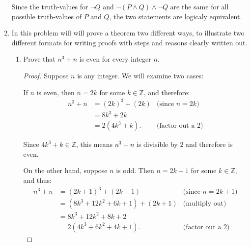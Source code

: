 \documentclass{article} %
\begin{document}
\begin{enumerate}
Since the truth-values for $\neg Q$ and $\neg(P \land Q) \land \neg Q$ are the same for all possible truth-values of $P$ and $Q$, the two statements are logicaly equivalent.


\item
In this problem will will prove a theorem two different ways, to illustrate two different formats for writing proofs with steps and reasons clearly written out.

\begin{enumerate}
\item Prove that $n^3+n$ is even for every integer $n$.

\begin{proof} %
Suppose $n$ is any integer.  We will examine two cases:
\vspace{.5\baselineskip}

If $n$ is even, then $n=2k$ for some $k \in \mathbb{Z}$, and therefore:
%
\begin{align*} %
n^3+n
  &= (2k)^3 + (2k) %
     &\mbox{(since $n=2k$)} \\ %
  &= 8k^3 + 2k \\
  &= 2(4k^3+k).  %
     &\mbox{(factor out a $2$)}
\end{align*}

Since $4k^3+k \in \mathbb{Z}$, this means $n^3+n$ is divisible by $2$ and therefore is even.
\vspace{.5\baselineskip}

On the other hand, suppose $n$ is odd.  Then $n=2k+1$ for some $k \in \mathbb{Z}$, and thus:
%
\begin{align*}
n^3+n
  &= (2k+1)^3 + (2k+1)
     &\mbox{(since $n=2k+1$)} \\
  &= (8k^3+12k^2+6k+1) + (2k+1)
     &\mbox{(multiply out)} \\
  &= 8k^3+12k^2+8k+2 \\
  &= 2(4k^3+6k^2+4k+1).
     &\mbox{(factor out a $2$)}
\end{align*}


\end{proof}
\end{enumerate}
\end{enumerate}
\end{document}
